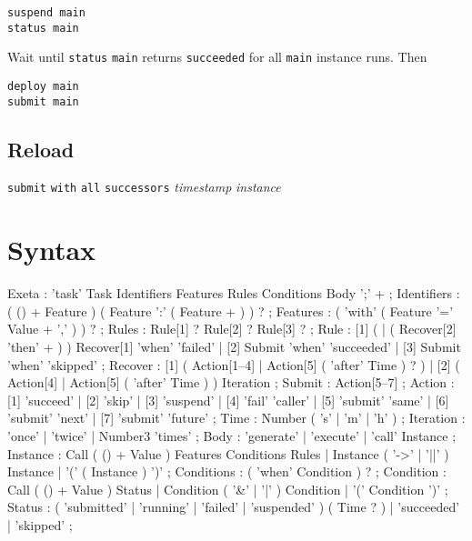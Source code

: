 \documentclass[a4paper,12pt,english,oneside]{book}
\newcommand{\exeta}{Exeta\xspace}
\begin{document}
\begin{verbatim}
suspend main
status main
\end{verbatim}
Wait until \verb|status| \verb|main| returns \verb|succeeded| for all \verb|main| instance runs. Then
\begin{verbatim}
deploy main
submit main
\end{verbatim}

\section{Reload}

\begin{flushleft}
    \verb|submit| \verb|with| \verb|all| \verb|successors| \emph{timestamp} \emph{instance}
\end{flushleft}

\appendix

\chapter{Syntax}


\begin{landscape}
\begin{rail}
Exeta
: 'task' Task Identifiers  Features Rules Conditions Body ';' +
;
Identifiers
: ( () + Feature ) ( Feature ':' ( Feature + ) ) ?
;
Features
: ( 'with' ( Feature '=' Value + ',' ) ) ?
;
Rules
: Rule[1] ? Rule[2] ? Rule[3] ?
;
Rule
: [1] ( | ( Recover[2] 'then' + ) ) Recover[1] 'when' 'failed'
| [2] Submit 'when' 'succeeded'
| [3] Submit 'when' 'skipped'
;
Recover
: [1] ( Action[1--4]
      | Action[5] ( 'after' Time ) ?
      )
| [2] ( Action[4]
      | Action[5] ( 'after' Time )
      ) Iteration
;
Submit
: Action[5--7]
;
Action
: [1] 'succeed'
| [2] 'skip'
| [3] 'suspend'
| [4] 'fail' 'caller'
| [5] 'submit' 'same'
| [6] 'submit' 'next'
| [7] 'submit' 'future'
;
Time
: Number ( 's' | 'm' | 'h' )
;
Iteration
: 'once'
| 'twice'
| Number3 'times'
;
Body
: 'generate'
| 'execute'
| 'call' Instance
;
Instance
: Call ( () + Value ) Features Conditions Rules
| Instance ( '->' | '||' ) Instance
| '(' ( Instance ) ')'
;
Conditions
: ( 'when' Condition ) ?
;
Condition
: Call ( () + Value ) Status
| Condition ( '\&' | '|' ) Condition
| '(' Condition ')'
;
Status
: ( 'submitted' | 'running' | 'failed' | 'suspended' ) ( Time ? )
| 'succeeded'
| 'skipped'
;
\end{rail}
\end{landscape}

\end{document}
